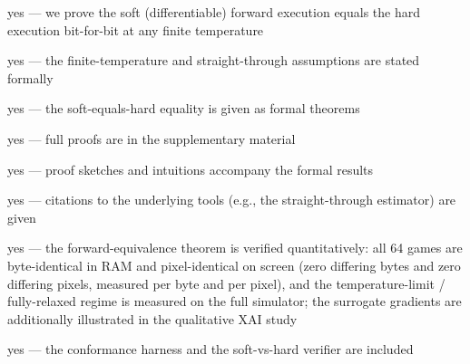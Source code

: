 \documentclass[letterpaper]{article}
\begin{document}
\begin{itemize}

yes --- we prove the soft (differentiable) forward execution equals the hard execution bit-for-bit at any finite temperature

        \begin{itemize}
	
	yes --- the finite-temperature and straight-through assumptions are stated formally

	yes --- the soft-equals-hard equality is given as formal theorems

	yes --- full proofs are in the supplementary material

	yes --- proof sketches and intuitions accompany the formal results

	yes --- citations to the underlying tools (e.g., the straight-through estimator) are given

	yes --- the forward-equivalence theorem is verified quantitatively: all 64 games are byte-identical in RAM and pixel-identical on screen (zero differing bytes and zero differing pixels, measured per byte and per pixel), and the temperature-limit / fully-relaxed regime is measured on the full simulator; the surrogate gradients are additionally illustrated in the qualitative XAI study

	yes --- the conformance harness and the soft-vs-hard verifier are included
	
	\end{itemize}
\end{itemize}
\end{document}
